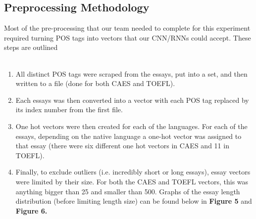 \documentclass[11pt,a4paper]{article}
\newcommand\tab[1][1cm]{\hspace*{#1}}
\begin{document}
\subsection{Preprocessing Methodology}
\tab Most of the pre-processing that our team needed to complete for this experiment required turning POS tags into vectors that our CNN/RNNs could accept. These steps are outlined\\
\\
\begin{enumerate}
\item All distinct POS tags were scraped from the essays, put into a set, and then written to a file (done for both CAES and TOEFL).
\item Each essays was then converted into a vector with each POS tag replaced by its index number from the first file.
\item One hot vectors were then created for each of the languages. For each of the essays, depending on the native language a  one-hot vector was assigned to that essay (there were six different one hot vectors in CAES and 11 in TOEFL).
\item Finally, to exclude outliers (i.e. incredibly short or long essays), essay vectors were limited by their size. For both the CAES and TOEFL vectors, this was anything bigger than 25 and smaller than 500. Graphs of the essay length distribution (before limiting length size) can be found below in \textbf{Figure 5} and \textbf{Figure 6.}
\end{enumerate}
\end{document}
